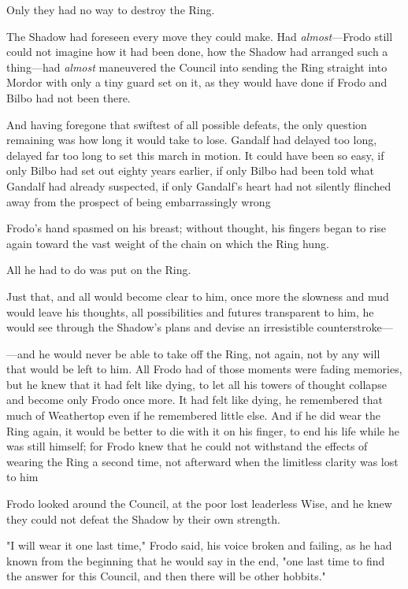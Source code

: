 Only they had no way to destroy the Ring.

The Shadow had foreseen every move they could make. Had \emph{almost}—Frodo
still could not imagine how it had been done, how the Shadow had arranged such
a thing—had \emph{almost} maneuvered the Council into sending the Ring
straight into Mordor with only a tiny guard set on it, as they would have done
if Frodo and Bilbo had not been there.

And having foregone that swiftest of all possible defeats, the only question
remaining was how long it would take to lose. Gandalf had delayed too long,
delayed far too long to set this march in motion. It could have been so easy,
if only Bilbo had set out eighty years earlier, if only Bilbo had been told
what Gandalf had already suspected, if only Gandalf's heart had not silently
flinched away from the prospect of being embarrassingly wrong{\el}

Frodo's hand spasmed on his breast; without thought, his fingers began to rise
again toward the vast weight of the chain on which the Ring hung.

All he had to do was put on the Ring.

Just that, and all would become clear to him, once more the slowness and mud
would leave his thoughts, all possibilities and futures transparent to him, he
would see through the Shadow's plans and devise an irresistible counterstroke—

—and he would never be able to take off the Ring, not again, not by any will
that would be left to him. All Frodo had of those moments were fading memories,
but he knew that it had felt like dying, to let all his towers of thought
collapse and become only Frodo once more. It had felt like dying, he remembered
that much of Weathertop even if he remembered little else. And if he did wear
the Ring again, it would be better to die with it on his finger, to end his
life while he was still himself; for Frodo knew that he could not withstand the
effects of wearing the Ring a second time, not afterward when the limitless
clarity was lost to him{\el}

Frodo looked around the Council, at the poor lost leaderless Wise, and he knew
they could not defeat the Shadow by their own strength.

"I will wear it one last time," Frodo said, his voice broken and failing, as he
had known from the beginning that he would say in the end, "one last time to
find the answer for this Council, and then there will be other hobbits."

